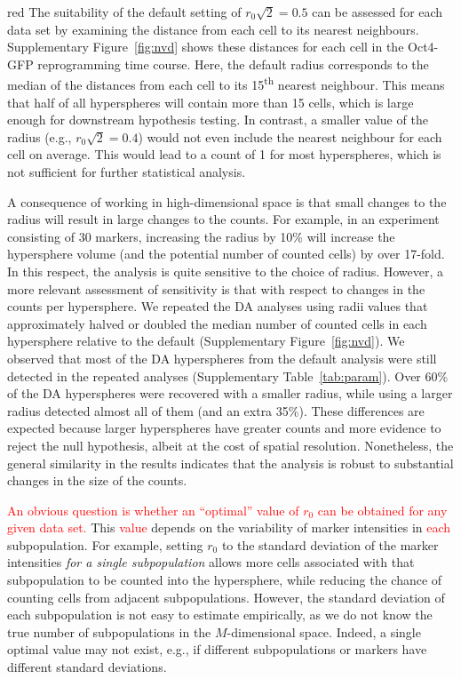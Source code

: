 \documentclass{article}
\newcommand\revised[1]{\textcolor{red}{#1}}
\begin{document}
\begin{color}{red}
The suitability of the default setting of $r_0\sqrt{2}=0.5$ can be assessed for each data set by examining the distance from each cell to its nearest neighbours.
Supplementary Figure~\ref{fig:nvd} shows these distances for each cell in the Oct4-GFP reprogramming time course.
Here, the default radius corresponds to the median of the distances from each cell to its 15\textsuperscript{th} nearest neighbour.
This means that half of all hyperspheres will contain more than 15 cells, which is large enough for downstream hypothesis testing.
In contrast, a smaller value of the radius (e.g., $r_0\sqrt{2}=0.4$) would not even include the nearest neighbour for each cell on average.
This would lead to a count of 1 for most hyperspheres, which is not sufficient for further statistical analysis.

A consequence of working in high-dimensional space is that small changes to the radius will result in large changes to the counts.
For example, in an experiment consisting of 30 markers, increasing the radius by 10\% will increase the hypersphere volume (and the potential number of counted cells) by over 17-fold. 
In this respect, the analysis is quite sensitive to the choice of radius.
However, a more relevant assessment of sensitivity is that with respect to changes in the counts per hypersphere.
We repeated the DA analyses using radii values that approximately halved or doubled the median number of counted cells in each hypersphere relative to the default (Supplementary Figure~\ref{fig:nvd}).
We observed that most of the DA hyperspheres from the default analysis were still detected in the repeated analyses (Supplementary Table~\ref{tab:param}).
Over 60\% of the DA hyperspheres were recovered with a smaller radius, while using a larger radius detected almost all of them (and an extra 35\%).
These differences are expected because larger hyperspheres have greater counts and more evidence to reject the null hypothesis, albeit at the cost of spatial resolution.
Nonetheless, the general similarity in the results indicates that the analysis is robust to substantial changes in the size of the counts.
\end{color}

\revised{An obvious question is whether an ``optimal'' value of $r_0$ can be obtained for any given data set.}
This \revised{value} depends on the variability of marker intensities in \revised{each} subpopulation.
For example, setting $r_0$ to the standard deviation of the marker intensities \textit{for a single subpopulation} allows more cells associated with that subpopulation to be counted into the hypersphere, while reducing the chance of counting cells from adjacent subpopulations.
However, the standard deviation of each subpopulation is not easy to estimate empirically, as we do not know the true number of subpopulations in the $M$-dimensional space.
Indeed, a single optimal value may not exist, e.g., if different subpopulations or markers have different standard deviations.
\end{document}
